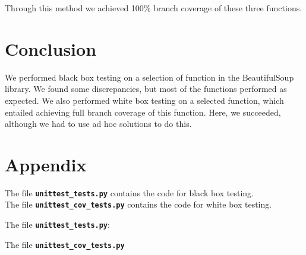 \documentclass[10pt]{article}
\newcommand{\tbt}[1]{\texttt{\textbf{#1}}}
\begin{document}
Through this method we achieved 100\% branch coverage of these three functions. 

\section{Conclusion}

We performed black box testing on a selection of function in the BeautifulSoup library. We found some discrepancies, but most of the functions performed as expected. We also performed white box testing on a selected function, which entailed achieving full branch coverage of this function. Here, we succeeded, although we had to use ad hoc solutions to do this.

\section{Appendix}

The file \tbt{unittest\_tests.py} contains the code for black box testing. \\
The file \tbt{unittest\_cov\_tests.py} contains the code for white box testing. \\
\vspace{1em}

\begin{adjustwidth}{-6.5em}{0em}
The file \tbt{unittest\_tests.py}:
 
\vspace{1em}

The file \tbt{unittest\_cov\_tests.py}

\end{adjustwidth}
\end{document}
